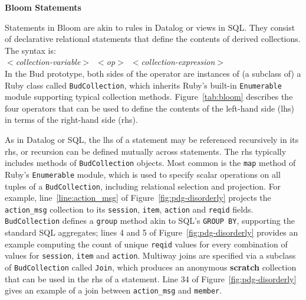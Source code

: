 \textbf{Bloom Statements}\\
\noindent

Statements in Bloom are akin to rules in Datalog or views in SQL.  They consist
of declarative relational statements that define the contents of derived
collections.  The syntax is:\\ \noindent
\mbox{\hspace{0.25in}\emph{$<$collection-variable$>$ $<$op$>$
$<$collection-expression$>$}}\\ \noindent In the Bud prototype, both sides of
the operator are instances of (a subclass of) a Ruby class called
\texttt{BudCollection}, which inherits Ruby's built-in \texttt{Enumerable}
module supporting typical collection methods.  Figure~\ref{tab:bloom} describes
the four operators that can be used to define the contents of the left-hand
side (lhs) in terms of the right-hand side (rhs).

As in Datalog or SQL, the lhs of a statement may be referenced recursively in
its rhs, or recursion can be defined mutually across statements.  The rhs
typically includes methods of \texttt{BudCollection} objects.  Most common is
the \texttt{map} method of Ruby's \texttt{Enumerable} module, which is used to
specify scalar operations on all tuples of a \texttt{BudCollection}, including
relational selection and projection. For example, line~\ref{line:action_msg} of
Figure~\ref{fig:pdg-disorderly} projects the \texttt{action\_msg} collection to
its \texttt{session}, \texttt{item}, \texttt{action} and \texttt{reqid} fields.
\texttt{BudCollection} defines a \texttt{group} method akin to SQL's
\texttt{GROUP BY}, supporting the standard SQL aggregates; lines 4 and 5 of
Figure~\ref{fig:pdg-disorderly} provides an example computing the count 
of unique \texttt{reqid} values for every combination of values for
\texttt{session}, \texttt{item} and \texttt{action}.
Multiway joins are specified via a subclass of \texttt{BudCollection} called
\texttt{Join}, which produces an anonymous \textbf{scratch} collection that can
be used in the rhs of a statement. 
Line 34 of Figure~\ref{fig:pdg-disorderly} gives an example of a join between
\texttt{action\_msg} and \texttt{member}.



